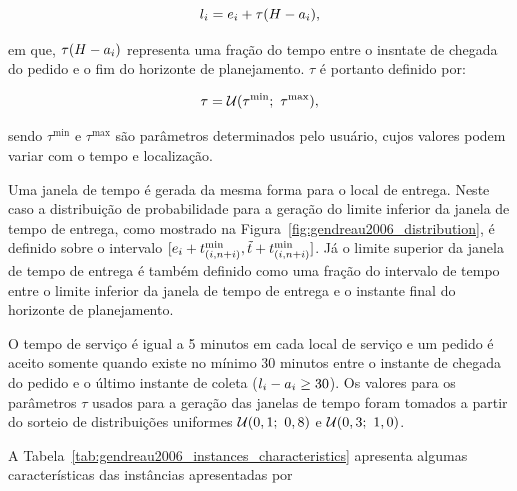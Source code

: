 \begin{equation}
    l_i = 
      e_i 
      + \tau(H - a_i),
\end{equation}

em que, $\tau(H - a_i)$ representa uma fração
do tempo entre o insntate de chegada do pedido e o fim do horizonte de
planejamento. $\tau$ é portanto definido por:

\begin{equation}
  \tau = \mathcal{U}(\tau^{\min};\ \tau^{\max}),
\end{equation}

sendo $\tau^{\min}$ e $\tau^{\max}$ são parâmetros determinados pelo usuário,
cujos valores podem variar com o tempo e localização.

Uma janela de tempo é gerada da mesma forma para o local de entrega. 
Neste caso a distribuição de probabilidade para a geração do limite inferior 
da janela de tempo de entrega, como mostrado na 
Figura~\ref{fig:gendreau2006_distribution}, é definido sobre o intervalo
$[e_i 
+ t_{(i,n + i)}^{\min}, 
\Tilde{t} + t_{(i,n + i)}^{\min}]$.
Já o limite superior da janela de tempo de entrega é também definido como uma
fração do intervalo de tempo entre o limite inferior da janela de tempo de
entrega e o instante final do horizonte de planejamento.

O tempo de serviço é igual a 5 minutos em cada local de serviço e um pedido é 
aceito somente quando existe no mínimo 30 minutos entre o instante de chegada 
do pedido e o último instante de coleta 
($l_i - a_{i} \geq 30$). 
Os valores para os parâmetros $\tau$ usados para a geração das janelas de tempo
foram tomados a partir do sorteio de distribuições uniformes 
$\mathcal{U}(0,1;\ 0,8)$ e $\mathcal{U}(0,3;\ 1,0)$.

A Tabela~\ref{tab:gendreau2006_instances_characteristics} apresenta algumas
características das instâncias apresentadas por
\textcite{gendreau_neighborhood_2006}

